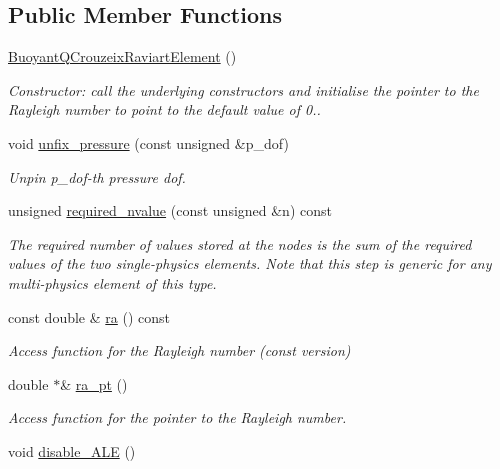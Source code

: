 \subsection*{Public Member Functions}
\begin{DoxyCompactItemize}
\item 
\hyperlink{classoomph_1_1BuoyantQCrouzeixRaviartElement_a9651742d190071d973ed5c154341d82b}{Buoyant\+Q\+Crouzeix\+Raviart\+Element} ()
\begin{DoxyCompactList}\small\item\em Constructor\+: call the underlying constructors and initialise the pointer to the Rayleigh number to point to the default value of 0.. \end{DoxyCompactList}\item 
void \hyperlink{classoomph_1_1BuoyantQCrouzeixRaviartElement_a9468f7a594a5b9a9a07d3bf27dbcff45}{unfix\+\_\+pressure} (const unsigned \&p\+\_\+dof)
\begin{DoxyCompactList}\small\item\em Unpin p\+\_\+dof-\/th pressure dof. \end{DoxyCompactList}\item 
unsigned \hyperlink{classoomph_1_1BuoyantQCrouzeixRaviartElement_a64b84c9cf74a06680136d465ff9e037b}{required\+\_\+nvalue} (const unsigned \&n) const
\begin{DoxyCompactList}\small\item\em The required number of values stored at the nodes is the sum of the required values of the two single-\/physics elements. Note that this step is generic for any multi-\/physics element of this type. \end{DoxyCompactList}\item 
const double \& \hyperlink{classoomph_1_1BuoyantQCrouzeixRaviartElement_a5876310641d9f5028de6d4263013e247}{ra} () const
\begin{DoxyCompactList}\small\item\em Access function for the Rayleigh number (const version) \end{DoxyCompactList}\item 
double $\ast$\& \hyperlink{classoomph_1_1BuoyantQCrouzeixRaviartElement_afa4d4ff16fa307b16feab1de7aaa90b6}{ra\+\_\+pt} ()
\begin{DoxyCompactList}\small\item\em Access function for the pointer to the Rayleigh number. \end{DoxyCompactList}\item 
void \hyperlink{classoomph_1_1BuoyantQCrouzeixRaviartElement_a534fc134280b7447eecc4cad46b2e4c5}{disable\+\_\+\+A\+LE} ()

\end{DoxyCompactItemize}

